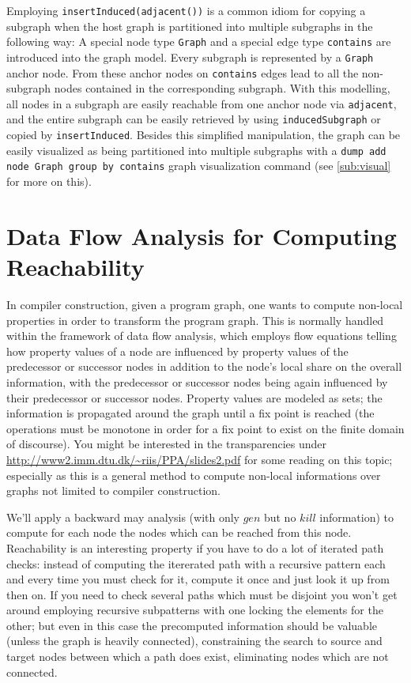 Employing \texttt{insertInduced(adjacent())} is a common idiom for copying a subgraph when the host graph is partitioned into multiple subgraphs in the following way:
A special node type \texttt{Graph} and a special edge type \texttt{contains} are introduced into the graph model. 
Every subgraph is represented by a \texttt{Graph} anchor node.
From these anchor nodes on \texttt{contains} edges lead to all the non-subgraph nodes contained in the corresponding subgraph.
With this modelling, all nodes in a subgraph are easily reachable from one anchor node via \texttt{adjacent}, and the entire subgraph can be easily retrieved by using \texttt{inducedSubgraph} or copied by \texttt{insertInduced}.
Besides this simplified manipulation, the graph can be easily visualized as being partitioned into multiple subgraphs with a \texttt{dump add node Graph group by contains} graph visualization command (see \ref{sub:visual} for more on this).


\section{Data Flow Analysis for Computing Reachability}\label{subsub:flow}

In compiler construction, given a program graph, one wants to compute non-local properties in order to transform the program graph.
This is normally handled within the framework of data flow analysis, which employs flow equations telling how property values of a node are influenced by property values of the predecessor or successor nodes in addition to the node's local share on the overall information, with the predecessor or successor nodes being again influenced by their predecessor or successor nodes.
Property values are modeled as sets; the information is propagated around the graph until a fix point is reached (the operations must be monotone in order for a fix point to exist on the finite domain of discourse).
You might be interested in the transparencies under \url{http://www2.imm.dtu.dk/~riis/PPA/slides2.pdf} for some reading on this topic;
especially as this is a general method to compute non-local informations over graphs not limited to compiler construction.

We'll apply a backward may analysis (with only $gen$ but no $kill$ information) to compute for each node the nodes which can be reached from this node.
Reachability is an interesting property if you have to do a lot of iterated path checks:
instead of computing the itererated path with a recursive pattern each and every time you must check for it,
compute it once and just look it up from then on.
If you need to check several paths which must be disjoint you won't get around employing recursive subpatterns with one locking the elements for the other; but even in this case the precomputed information should be valuable (unless the graph is heavily connected), constraining the search to source and target nodes between which a path does exist, eliminating nodes which are not connected.

